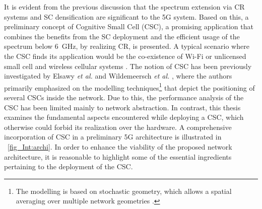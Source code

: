 It is evident from the previous discussion that the spectrum extension via CR systems and SC densification are significant to the 5G system. %
Based on this, a preliminary concept of Cognitive Small Cell (CSC), a promising application that combines the benefits from the SC deployment and the efficient usage of the spectrum below \SI{6}{GHz}, by realizing CR, is presented. A typical scenario where the CSC finds its application would be the co-existence of Wi-Fi or unlicensed small cell and wireless cellular systems \cite{Benn13, Gali15}. The notion of CSC has been previously investigated by Elsawy \textit{et al.} \cite{Elsawy13, Elsawy13_cmag} and Wildemeersch \textit{et al.} \cite{Wild13}, where the authors primarily emphasized on the modelling techniques\footnote{The modelling is based on stochastic geometry, which allows a spatial averaging over multiple network geometries \cite{Haenggi, Haenggi08now}.} that depict the positioning of several CSCs inside the network. Due to this, the performance analysis of the CSC has been limited mainly to network abstraction. In contrast, this thesis examines the fundamental aspects encountered while deploying a CSC, which otherwise could forbid its realization over the hardware. %
 A comprehensive incorporation of CSC in a preliminary 5G architecture is illustrated in \figurename~\ref{fig_Int:archi}. In order to enhance the viability of the proposed network architecture, it is reasonable to highlight some of the essential ingredients pertaining to the deployment of the CSC.

